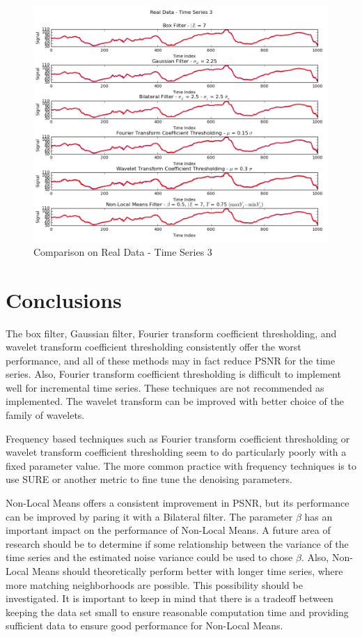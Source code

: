 \documentclass[11pt]{article}
\theoremstyle{definition}
\begin{document}
\begin{figure}[h!]
\centering
\includegraphics[width = 0.95 \textwidth]{TimeSeries3RealCompare.png}
\caption{Comparison on Real Data - Time Series 3}
\label{timeseries3realcompare}
\end{figure}


\section{Conclusions}

The box filter, Gaussian filter, Fourier transform coefficient thresholding, and wavelet transform coefficient thresholding consistently offer the worst performance, and all of these methods may in fact reduce PSNR for the time series. Also, Fourier transform coefficient thresholding is difficult to implement well for incremental time series. These techniques are not recommended as implemented. The wavelet transform can be improved with better choice of the family of wavelets.

Frequency based techniques such as Fourier transform coefficient thresholding or wavelet transform coefficient thresholding seem to do particularly poorly with a fixed parameter value. The more common practice with frequency techniques is to use SURE or another metric to fine tune the denoising parameters.

Non-Local Means offers a consistent improvement in PSNR, but its performance can be improved by paring it with a Bilateral filter. The parameter $\beta$ has an important impact on the performance of Non-Local Means. A future area of research should be to determine if some relationship between the variance of the time series and the estimated noise variance could be used to chose $\beta$. Also, Non-Local Means should theoretically perform better with longer time series, where more matching neighborhoods are possible. This possibility should be investigated. It is important to keep in mind that there is a tradeoff between keeping the data set small to ensure reasonable computation time and providing sufficient data to ensure good performance for Non-Local Means.
\end{document}
